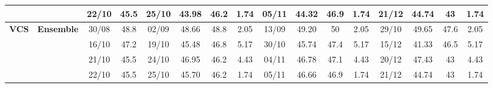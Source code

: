 \documentclass{ieeeaccess}
\begin{document}
\begin{table}[!h]
\begin{tabular}{llcc|cccc|cccc|cccc}
&
& 22/10 & 45.5 & 25/10 & 43.98 & 46.2 & 1.74 & 05/11 & 44.32 & 46.9 & 1.74 & 21/12 & 44.74 & 43 & 1.74 \\
\midrule



\multirow{4}{*}{\textbf{VCS}} 
& \textbf{Ensemble}
& 30/08 & 48.8 & 02/09 & 48.66 & 48.8 & 2.05 & 13/09 & 49.20 & 50 & 2.05 & 29/10 & 49.65 & 47.6 & 2.05 \\

&
& 16/10 & 47.2 & 19/10 & 45.48 & 46.8 & 5.17 & 30/10 & 45.74 & 47.4 & 5.17 & 15/12 & 41.33 & 46.5 & 5.17 \\

&
& 21/10 & 45.5 & 24/10 & 46.95 & 46.2 & 4.43 & 04/11 & 46.78 & 47.1 & 4.43 & 20/12 & 47.43 & 43 & 4.43 \\

&
& 22/10 & 45.5 & 25/10 & 45.70 & 46.2 & 1.74 & 05/11 & 46.66 & 46.9 & 1.74 & 21/12 & 44.74 & 43 & 1.74  \\


\bottomrule
\end{tabular}
\end{table}
\end{document}
